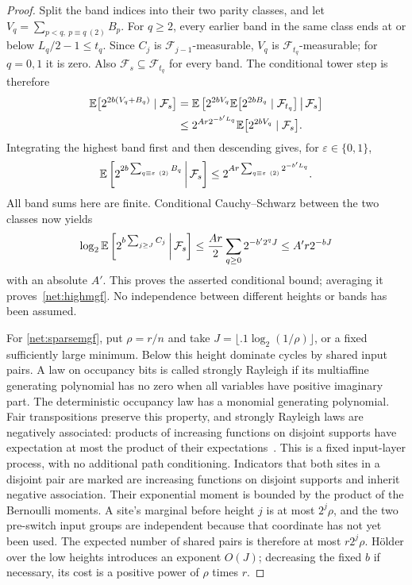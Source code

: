 \begin{proof}
Split the band indices into their two parity classes, and let
$V_q=\sum_{p<q,\ p\equiv q\ (2)}B_p$.
For $q\ge2$, every earlier band in the same class ends at or
below $L_q/2-1\le t_q$. Since $C_j$ is
$\mathcal F_{j-1}$-measurable, $V_q$ is
$\mathcal F_{t_q}$-measurable; for $q=0,1$ it is zero.
Also $\mathcal F_s\subseteq\mathcal F_{t_q}$ for every band.
The conditional tower step is therefore
\begin{align*}
 \mathbb E\bigl[2^{2b(V_q+B_q)}\mid\mathcal F_s\bigr]
 &=\mathbb E\left[2^{2bV_q}
       \mathbb E\bigl[2^{2bB_q}\mid\mathcal F_{t_q}\bigr]
       \,\middle|\,\mathcal F_s\right]\\
 &\le 2^{Ar2^{-b'L_q}}
       \mathbb E\bigl[2^{2bV_q}\mid\mathcal F_s\bigr].
\end{align*}
Integrating the highest band first and then descending gives,
for $\varepsilon\in\{0,1\}$,
\[
 \E\left[2^{2b\sum_{q\equiv\varepsilon\ (2)}B_q}
       \,\middle|\,\mathcal F_s\right]
 \le 2^{Ar\sum_{q\equiv\varepsilon\ (2)}2^{-b'L_q}}.
\]
All band sums here are finite. Conditional Cauchy--Schwarz between
the two classes now yields
\[
 \log_2\mathbb E\left[2^{b\sum_{j\ge J}C_j}
       \,\middle|\,\mathcal F_s\right]
 \le\frac{Ar}{2}\sum_{q\ge0}2^{-b'2^qJ}
 \le A'r2^{-bJ}
\]
with an absolute $A'$. This proves the asserted conditional bound;
averaging it proves~\eqref{net:highmgf}. No independence between
different heights or bands has been assumed.

For \eqref{net:sparsemgf}, put $\rho=r/n$ and take $J=\lfloor .1\log_2(1/\rho)\rfloor$, or a fixed sufficiently large minimum. Below this height dominate cycles by shared input pairs. A law on occupancy bits is called strongly Rayleigh if its multiaffine generating polynomial has no zero when all variables have positive imaginary part. The deterministic occupancy law has a monomial generating polynomial. Fair transpositions preserve this property, and strongly Rayleigh laws are negatively associated: products of increasing functions on disjoint supports have expectation at most the product of their expectations~\cite[Theorems~4.9 and~4.20]{BorceaBrandenLiggett2009}. This is a fixed input-layer process, with no additional path conditioning. Indicators that both sites in a disjoint pair are marked are increasing functions on disjoint supports and inherit negative association. Their exponential moment is bounded by the product of the Bernoulli moments. A site's marginal before height $j$ is at most $2^j\rho$, and the two pre-switch input groups are independent because that coordinate has not yet been used. The expected number of shared pairs is therefore at most $r2^j\rho$. H\"older over the low heights introduces an exponent $O(J)$; decreasing the fixed $b$ if necessary, its cost is a positive power of $\rho$ times $r$.


\end{proof}
